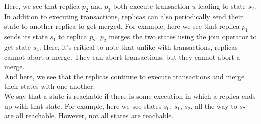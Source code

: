 \begin{frame}
{    Here, we see that replica $p_2$ and $p_3$ both execute transaction $u$
    leading to state $s_2$. \\[12pt]

    In addition to executing transactions, replicas can also periodically send
    their state to another replica to get merged. For example, here we see that
    replica $p_1$ sends its state $s_1$ to replica $p_2$. $p_2$ merges the two
    states using the join operator to get state $s_4$. Here, it's critical to
    note that unlike with transactions, replicas cannot abort a merge. They
    can abort transactions, but they cannot abort a merge. \\[12pt]

    And here, we see that the replicas continue to execute transactions and
    merge their states with one another. \\[12pt]

    We say that a state is reachable if there is some execution in which a
    replica ends up with that state. For example, here we see states $s_0$,
    $s_1$, $s_2$, all the way to $s_7$ are all reachable. However, not all
    states are reachable.

  }
\end{frame}

